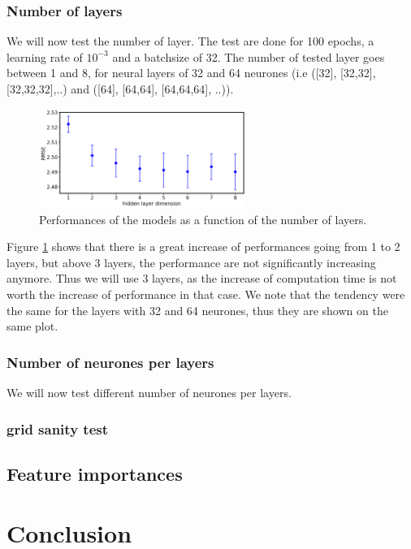 \documentclass[a4paper, 11pt]{article}
\begin{document}
    \subsubsection{Number of layers}
    We will now test the number of layer. The test are done for 100 epochs,  a learning rate of $10^{-3}$  and a batchsize of 32. The number of tested layer goes between 1 and 8, for neural layers of 32 and 64 neurones (i.e ([32], [32,32], [32,32,32],..)  and ([64], [64,64], [64,64,64], ..)).
	\begin{figure}[H]                                           
    	\centering \includegraphics[width=0.6\textwidth]{images/ndim_test.png}
    	\caption{Performances of the models as a function of the number of layers.}
    	\label{fig:ndim_test}
	\end{figure}
	Figure \ref{fig:ndim_test} shows that there is a great increase of performances going from 1 to 2 layers, but above 3 layers, the performance are not significantly increasing anymore. Thus we will use 3 layers, as the increase of computation time is not worth the increase of performance in that case. We note that the tendency were the same for the layers with 32 and 64 neurones, thus they are shown on the same plot.
    
    \subsubsection{Number  of neurones per layers}
    We will now test different number of neurones per layers. 
    
   
   	\subsubsection{grid sanity test}
    
    \subsection{Feature importances}
    
    
    
    \section{Conclusion}
    
    
    
\end{document}
